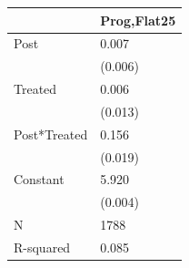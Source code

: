 \begin{tabular}{ll}
\toprule
 & Prog,Flat25 \\
\midrule
Post & 0.007 \\
 & (0.006) \\
Treated & 0.006 \\
 & (0.013) \\
Post*Treated & 0.156 \\
 & (0.019) \\
Constant & 5.920 \\
 & (0.004) \\
N & 1788 \\
R-squared & 0.085 \\
\bottomrule
\end{tabular}
